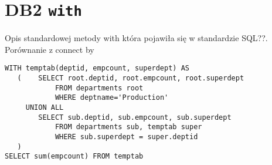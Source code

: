 \section{DB2 \texttt{with}}


Opis standardowej metody with która pojawiła się w standardzie SQL??. Porównanie z connect by

\begin{verbatim}
WITH temptab(deptid, empcount, superdept) AS
   (    SELECT root.deptid, root.empcount, root.superdept
            FROM departments root
            WHERE deptname='Production'
     UNION ALL
        SELECT sub.deptid, sub.empcount, sub.superdept
            FROM departments sub, temptab super
            WHERE sub.superdept = super.deptid
   )
SELECT sum(empcount) FROM temptab
\end{verbatim}

